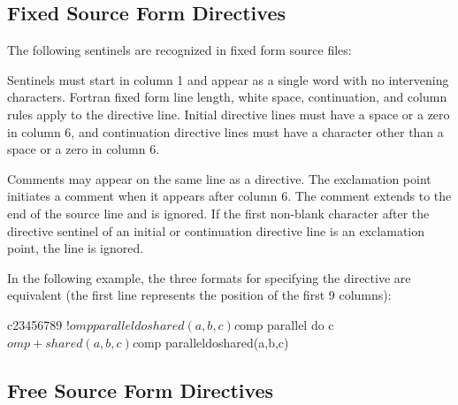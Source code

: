 \begin{fortranspecific}

\subsection{Fixed Source Form Directives}
\label{subsec:Fixed Source Form Directives}

The following sentinels are recognized in fixed form source files:


Sentinels must start in column 1 and appear as a single word with no intervening
characters. Fortran fixed form line length, white space, continuation, and column 
rules apply to the directive line. Initial directive lines must have a space or 
a zero in column 6, and continuation directive lines must have a character other 
than a space or a zero in column 6.

Comments may appear on the same line as a directive. The exclamation point initiates a
comment when it appears after column 6. The comment extends to the end of the source
line and is ignored. If the first non-blank character after the directive sentinel of 
an initial or continuation directive line is an exclamation point, the line is ignored.

\begin{note}
In the following example, the three formats for specifying the directive are
equivalent (the first line represents the position of the first 9 columns):

\begin{ompfPragma}
c23456789
!$omp parallel do shared(a,b,c)

c$omp parallel do
c$omp+shared(a,b,c)

c$omp paralleldoshared(a,b,c)
\end{ompfPragma}
\end{note}










\subsection{Free Source Form Directives}
\label{subsec:Free Source Form Directives}


\end{fortranspecific}
